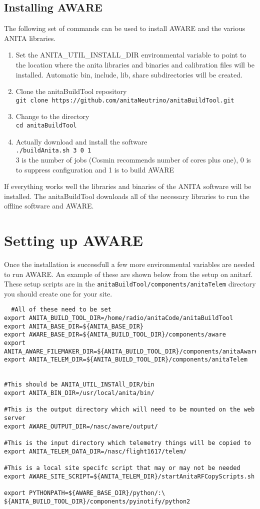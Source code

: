 \documentclass{article}
\begin{document}
\subsection{Installing AWARE}
The following set of commands can be used to install AWARE and the various ANITA libraries.
\begin{enumerate}
\item Set the ANITA\_UTIL\_INSTALL\_DIR environmental variable to point to the location where the anita libraries and binaries and calibration files will be installed. Automatic bin, include, lib, share subdirectories will be created.
\item Clone the anitaBuildTool repository \\{\tt git clone https://github.com/anitaNeutrino/anitaBuildTool.git}
\item Change to the directory \\ {\tt cd anitaBuildTool}
\item Actually download and install the software\\{\tt ./buildAnita.sh 3 0 1}\\  3 is the number of jobs (Cosmin recommends number of cores plus one), 0 is to suppress configuration and 1 is to build AWARE
\end{enumerate}
If everything works well the libraries and binaries of the ANITA software will be installed. The anitaBuildTool downloads all of the necessary libraries to run the offline software and AWARE.

\section{Setting up AWARE}
Once the installation is successfull a few more environmental variables are needed to run AWARE. An example of these are shown below from the setup on anitarf. These setup scripts are in the {\tt anitaBuildTool/components/anitaTelem} directory you should create one for your site.
\begin{verbatim}
  #All of these need to be set
export ANITA_BUILD_TOOL_DIR=/home/radio/anitaCode/anitaBuildTool
export ANITA_BASE_DIR=${ANITA_BASE_DIR}
export AWARE_BASE_DIR=${ANITA_BUILD_TOOL_DIR}/components/aware
export ANITA_AWARE_FILEMAKER_DIR=${ANITA_BUILD_TOOL_DIR}/components/anitaAwareFileMaker/
export ANITA_TELEM_DIR=${ANITA_BUILD_TOOL_DIR}/components/anitaTelem


#This should be ANITA_UTIL_INSTAll_DIR/bin
export ANITA_BIN_DIR=/usr/local/anita/bin/

#This is the output directory which will need to be mounted on the web server
export AWARE_OUTPUT_DIR=/nasc/aware/output/

#This is the input directory which telemetry things will be copied to
export ANITA_TELEM_DATA_DIR=/nasc/flight1617/telem/

#This is a local site specifc script that may or may not be needed
export AWARE_SITE_SCRIPT=${ANITA_TELEM_DIR}/startAnitaRFCopyScripts.sh

export PYTHONPATH=${AWARE_BASE_DIR}/python/:\
${ANITA_BUILD_TOOL_DIR}/components/pyinotify/python2
\end{verbatim}
\end{document}
